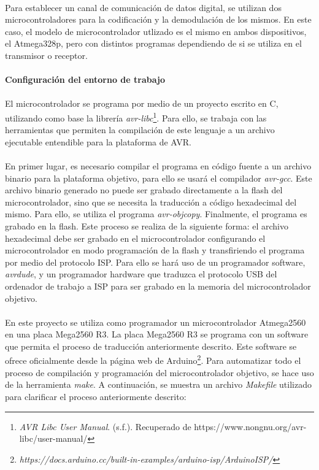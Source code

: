 \paragraph{}
Para establecer un canal de comunicación de datos digital, se utilizan dos microcontroladores para la codificación y la demodulación de los mismos. En este caso, el modelo de microcontrolador utlizado es el mismo en ambos dispositivos, el Atmega328p, pero con distintos programas dependiendo de si se utiliza en el transmisor o receptor.

\paragraph{Configuraci\'on del entorno de trabajo}
\paragraph{}
El microcontrolador se programa por medio de un proyecto escrito en C, utilizando como base la librería \textit{avr-libc}\footnote{\textit{AVR Libc User Manual}. (s.f.). Recuperado de https://www.nongnu.org/avr-libc/user-manual/}.
Para ello, se trabaja con las herramientas que permiten la compilación de este lenguaje a un archivo ejecutable entendible para la plataforma de AVR.
\paragraph{}
En primer lugar, es necesario compilar el programa en c\'odigo fuente a un archivo binario para la plataforma objetivo, para ello se usar\'a el compilador \textit{avr-gcc}. Este archivo binario generado no puede ser grabado directamente a la flash del microcontrolador, sino que se necesita la traducción a código hexadecimal del mismo. Para ello, se utiliza el programa \textit{avr-objcopy}. 
Finalmente, el programa es grabado en la flash. Este proceso se realiza de la siguiente forma: el archivo hexadecimal debe ser grabado en el microcontrolador configurando el microcontrolador en modo programaci\'on de la flash y transfiriendo el programa por medio del protocolo ISP. 
Para ello se har\'a uso de un programador software, \textit{avrdude}, y un programador hardware que traduzca el protocolo USB del ordenador de trabajo a ISP para ser grabado en la memoria del microcontrolador objetivo. 
\paragraph{}
En este proyecto se utiliza como programador un microcontrolador Atmega2560 en una placa Mega2560 R3. 
La placa Mega2560 R3 se programa con un software que permita el proceso de traducción anteriormente descrito. Este software se ofrece oficialmente desde la p\'agina web de Arduino\footnote{\textit{https://docs.arduino.cc/built-in-examples/arduino-isp/ArduinoISP/}}.
Para automatizar todo el proceso de compilaci\'on y programaci\'on del microcontrolador objetivo, se hace uso de la herramienta \textit{make}. A continuaci\'on, se muestra un archivo \textit{Makefile} utilizado para clarificar el proceso anteriormente descrito:

